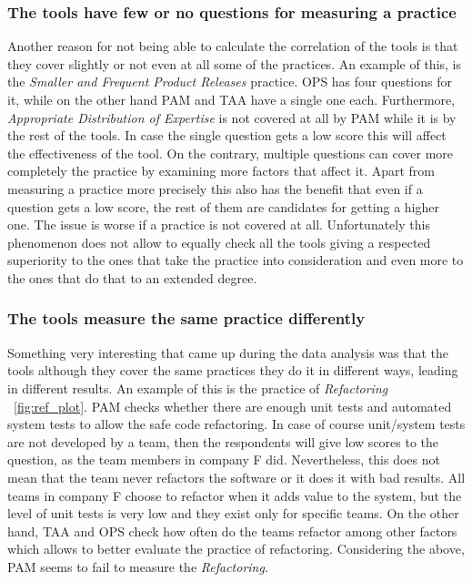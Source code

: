 \subsubsection{The tools have few or no questions for measuring a practice}
Another reason for not being able to calculate the correlation of the tools is that they cover slightly or not even at all some of the practices. An example of this, is the \textit{Smaller and Frequent Product Releases} practice. OPS has four questions for it, while on the other hand PAM and TAA have a single one each. Furthermore, \textit{Appropriate Distribution of Expertise} is not covered at all by PAM while it is by the rest of the tools. In case the single question gets a low score this will affect the effectiveness of the tool. On the contrary, multiple questions can cover more completely the practice by examining more factors that affect it. Apart from measuring a practice more precisely this also has the benefit that even if a question gets a low score, the rest of them are candidates for getting a higher one. The issue is worse if a practice is not covered at all. Unfortunately this phenomenon does not allow to equally check all the tools giving a respected superiority to the ones that take the practice into consideration and even more to the ones that do that to an extended degree.

\subsubsection{The tools measure the same practice differently}
Something very interesting that came up during the data analysis was that the tools although they cover the same practices they do it in different ways, leading in different results. An example of this is the practice of \textit{Refactoring} ~\ref{fig:ref_plot}. PAM checks whether there are enough unit tests and automated system tests to allow the safe code refactoring. In case of course unit/system tests are not developed by a team, then the respondents will give low scores to the question, as the team members in company F did. Nevertheless, this does not mean that the team never refactors the software or it does it with bad results. All teams in company F choose to refactor when it adds value to the system, but the level of unit tests is very low and they exist only for specific teams. On the other hand, TAA and OPS check how often do the teams refactor among other factors which allows to better evaluate the practice of refactoring. Considering the above, PAM seems to fail to measure the \textit{Refactoring}.

